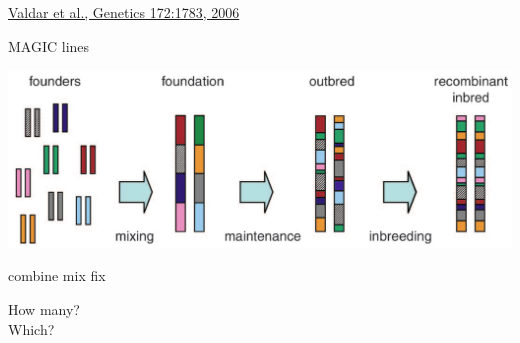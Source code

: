 \documentclass[12pt]{article}
\newcommand{\citesize}{\fontsize{14}{18} \selectfont}
\newcommand{\headsize}{\fontsize{35}{35} \selectfont}
\newcommand{\smallsize}{\fontsize{25}{30} \selectfont}
\newcommand{\smallersize}{\fontsize{20}{25} \selectfont}
\begin{document}
{\vfill

\hfill {\citesize \color{citecolor} \href{http://www.genetics.org/content/172/3/1783.full}{Valdar et al., Genetics 172:1783, 2006}}

\vspace*{5mm}


\newpage

\addtocounter{page}{-1}

\headsize \color{myyellow}
\hfill \begin{minipage}{5.75in}
\centering
MAGIC lines
\end{minipage}

\vspace{20mm}

\centerline{\includegraphics[width=10in]{Figs/valdar_genet2006.png}}

\smallsize \color{myyellow}
\hspace*{52mm} combine \hspace*{35mm} mix \hspace*{52mm} fix

\smallersize
\color{mywhite}
\vspace{20pt}

\hspace*{6mm}
\begin{minipage}[t]{45mm}
\vspace*{0mm}
\centering

How many? \\[20pt]
Which?
\end{minipage}
\hspace{57mm}
\begin{minipage}[t]{45mm}
\vspace*{0mm}
\centering

\end{minipage}
\hspace{18mm}
\begin{minipage}[t]{45mm}
\vspace*{0mm}
\centering


\end{minipage}


}
\end{document}
